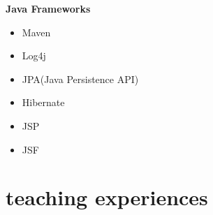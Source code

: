 \documentclass[]{friggeri-cv} %
\begin{document}
\begin{entrylist}
{	\textbf{Java Frameworks}
	\begin{itemize}
		\item Maven
		\item Log4j
		\item JPA(Java Persistence API)
		\item Hibernate
		\item JSP
		\item JSF
	\end{itemize}
}



\end{entrylist}


\section{teaching experiences}
\end{document}
